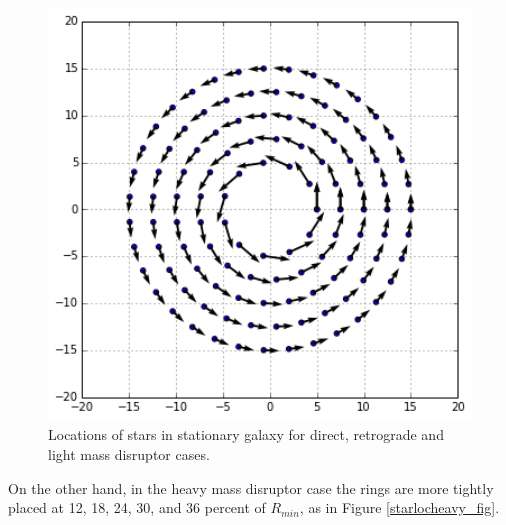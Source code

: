 \documentclass[11pt]{article}
\begin{document}
\begin{figure}[h!]
\centering
\includegraphics[width=5in]{DirectPassageImage.png}
\caption{Locations of stars in stationary galaxy for direct, retrograde and light mass disruptor cases.}
\label{starlocdirect_fig}
\end{figure}

On the other hand, in the heavy mass disruptor case the rings are more tightly placed at 12, 18, 24, 30, and 36 percent of $R_{min}$, as in Figure \ref{starlocheavy_fig}.
\end{document}
